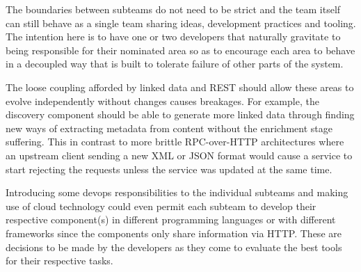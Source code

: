 The boundaries between subteams do not need to be strict and the team
itself can still behave as a single team sharing ideas, development practices
and tooling. The intention here is to have one or two developers that naturally
gravitate to being responsible for their nominated area so as to encourage
each area to behave in a decoupled way that is built to tolerate failure of
other parts of the system.

The loose coupling afforded by linked data and REST should allow these areas
to evolve independently without changes causes breakages. For example, the
discovery component should be able to generate more linked data through finding
new ways of extracting metadata from content without the enrichment stage
suffering. This in contrast to more brittle RPC-over-HTTP architectures where
an upstream client sending a new XML or JSON format would cause a service to
start rejecting the requests unless the service was updated at the same time.

Introducing some devops responsibilities to the individual subteams and
making use of cloud technology could even permit each subteam to
develop their respective component(s) in different programming languages or
with different frameworks since the components only share information
via HTTP. These are decisions to be made by the developers as they come
to evaluate the best tools for their respective tasks.
